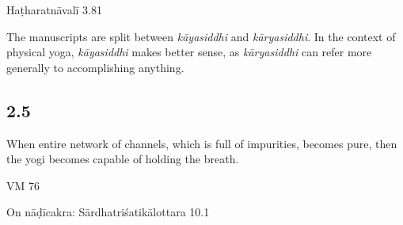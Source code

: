 \begin{ekdosis}

\begin{testimonia}[hp02_004]
Haṭharatnāvalī 3.81

\begin{versinnote}
\end{versinnote}
\end{testimonia}

\begin{philcomm}[hp02_004]
The manuscripts are split between \emph{kāyasiddhi} and \emph{kāryasiddhi}. In the context of physical yoga, \emph{kāyasiddhi} makes better sense, as \emph{kāryasiddhi} can refer more generally to accomplishing anything. 
\end{philcomm}

\subsection*{2.5}
\begin{translation}[hp02_005]
When entire network of channels, which is full of impurities, becomes pure, then the yogi becomes capable of holding the breath.
\end{translation}

\begin{sources}[hp02_005]
VM 76

\begin{versinnote}
\end{versinnote}
On nāḍīcakra: Sārdhatriśatikālottara 10.1

\begin{versinnote}
\end{versinnote}
\end{sources}


\end{ekdosis}
